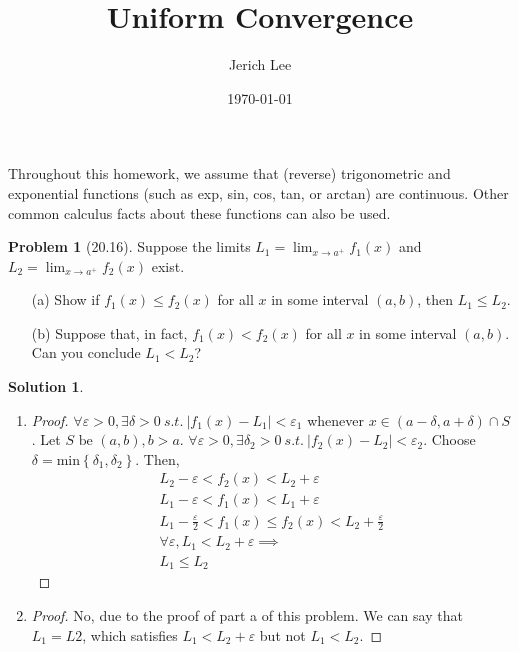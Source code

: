 \documentclass[12pt]{article}
\title{Uniform Convergence}
\author{Jerich Lee}
\date{\today}
\theoremstyle{definition} %
\newtheorem{solution}{Solution}
\newtheorem{problem}{Problem}
\theoremstyle{plain} %
\begin{document}
\maketitle
Throughout this homework, we assume that (reverse) trigonometric and exponential functions (such as exp, sin, cos, tan, or arctan) are continuous. Other common calculus facts about these functions can also be used.
\begin{problem}[20.16]
    Suppose the limits $ L_1 = \lim_{x \to a^+} f_1(x) $ and $ L_2 = \lim_{x \to a^+} f_2(x) $ exist.

\begin{enumerate}
    \item[(a)] Show if $ f_1(x) \leq f_2(x) $ for all $ x $ in some interval $ (a, b) $, then $ L_1 \leq L_2 $.
    \item[(b)] Suppose that, in fact, $ f_1(x) < f_2(x) $ for all $ x $ in some interval $ (a, b) $. Can you conclude $ L_1 < L_2 $?
\end{enumerate}
\end{problem}
\begin{solution}
\begin{enumerate}
\item \begin{proof}
    $\forall \varepsilon>0, \exists \delta >0 \ s.t. \ \left\vert f_1(x)-L_1 \right\vert <\varepsilon_1$ whenever $x\in (a- \delta, a+\delta)\cap S$. Let $S \text{ be }  (a,b), b>a$. $\forall \varepsilon>0, \exists \delta_2 >0 \ s.t. \ \left\vert f_2(x)-L_2 \right\vert <\varepsilon_2$. Choose $\delta = \text{min}\left\{ \delta_1, \delta_2 \right\}$. Then,
    \begin{align}
        L_2 - \varepsilon < f_2(x) < L_2 + \varepsilon \\[10pt] 
        L_1 - \varepsilon < f_1(x) < L_1 + \varepsilon \\[10pt] 
        L_1 - \frac{\varepsilon}{2} < f_1(x) \leq f_2(x) <L_2 +\frac{\varepsilon}{2} \\[10pt] 
        \forall \varepsilon, L_1 < L_2 + \varepsilon \implies \\[10pt] 
        L_1 \leq L_2
    \end{align} 
\end{proof}
\item \begin{proof}
    No, due to the proof of part a of this problem. We can say that $L_1=L2$, which satisfies $L_1<L_{2}+\varepsilon$ but not $L_1 < L_2$. 
\end{proof}
\end{enumerate}    
\end{solution}
\end{document}
